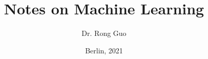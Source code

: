 \titlehead{\centering Technische Universität Berlin | Fakultät IV | Neuronale Informationsverarbeitung}
\title{\Large Notes on Machine Learning}
\author{Dr. Rong Guo}
\date{Berlin, 2021}
\publishers{}

\maketitle

\setcounter{tocdepth}{3}
\setcounter{secnumdepth}{3}
\tableofcontents{}

\clearpage
